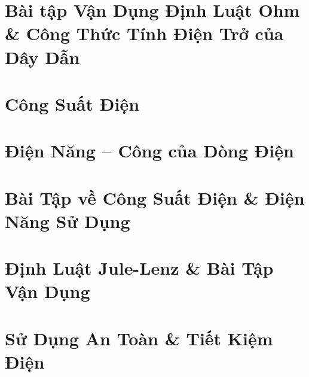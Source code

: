 \documentclass{article}
\begin{document}

\section{Bài tập Vận Dụng Định Luật Ohm \& Công Thức Tính Điện Trở của Dây Dẫn}


\section{Công Suất Điện}


\section{Điện Năng -- Công của Dòng Điện}


\section{Bài Tập về Công Suất Điện \& Điện Năng Sử Dụng}


\section{Định Luật Jule-Lenz \& Bài Tập Vận Dụng}


\section{Sử Dụng An Toàn \& Tiết Kiệm Điện}


\printbibliography[heading=bibintoc]
	
\end{document}
